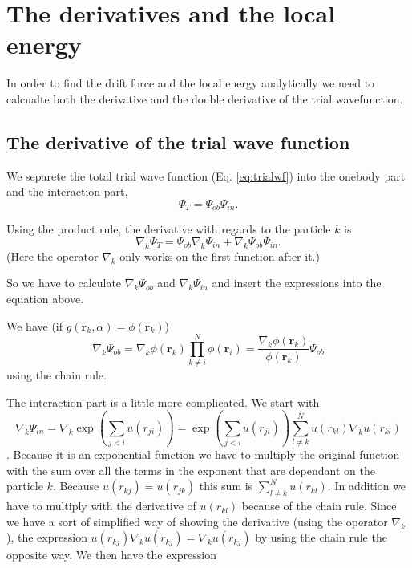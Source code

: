 \section{The derivatives and the local energy}

In order to find the drift force and the local energy analytically we need to calcualte both the derivative and the double derivative of the trial wavefunction.

\subsection{The derivative of the trial wave function}

We separete the total trial wave function (Eq. \ref{eq:trialwf}) into the onebody part and the interaction part,
\begin{equation}
\Psi_T = \Psi_{ob}\Psi_{in}.
\end{equation}

Using the product rule, the derivative with regards to the particle $k$ is
$$ \nabla_k \Psi_T =  \Psi_{ob}\nabla_k\Psi_{in} + \nabla_k\Psi_{ob}\Psi_{in}.$$
(Here the operator $\nabla_k$ only works on the first function after it.)

So we have to calculate $\nabla_k\Psi_{ob}$ and $\nabla_k\Psi_{in}$ and insert the expressions into the equation above.

We have (if $g(\mathbf{r}_k,\alpha) = \phi(\mathbf{r}_k)$)
\begin{equation}\label{eq:psi_ob_derivative}
\nabla_k\Psi_{ob} = \nabla_k \phi(\mathbf{r}_k)\prod_{k\neq i}^N \phi(\mathbf{r}_i)= \frac{\nabla_k \phi(\mathbf{r}_k)}{\phi(\mathbf{r}_k)} \Psi_{ob}
\end{equation}
using the chain rule.

The interaction part is a little more complicated. We start with
$$ \nabla_k\Psi_{in} = \nabla_k  \exp{\left(\sum_{j<i}u(r_{ji})\right)} = \exp{\left(\sum_{j<i}u(r_{ji})\right)} \sum^N_{l \neq k}  u\left(r_{kl}\right) \nabla_k u (r_{kl}) $$. Because it is an exponential function we have to multiply the original function with the sum over all the terms in the exponent that are dependant on the particle $k$. Because $u(r_{kj}) = u(r_{jk})$ this sum is $\sum^N_{l \neq k}  u\left(r_{kl}\right)$. In addition we have to multiply with the derivative of $u(r_{kl})$ because of the chain rule. Since we have a sort of simplified way of showing the derivative (using the operator $\nabla_k$), the expression $u(r_{kj})\nabla_k u(r_{kj}) = \nabla_k u(r_{kj})$ by using the chain rule the opposite way. We then have the expression

